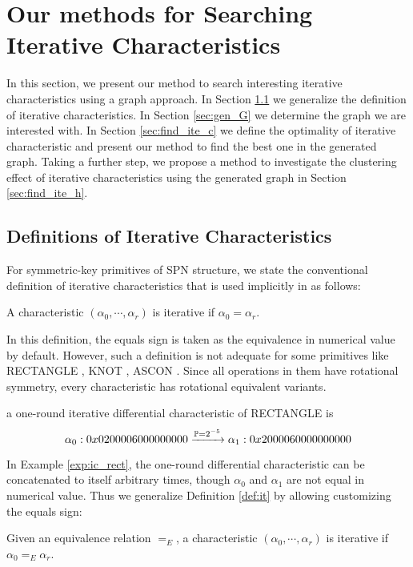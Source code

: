 \section{Our methods for Searching Iterative Characteristics}\label{sec:method_ite}

In this section, we present our method to search interesting iterative characteristics using a graph approach. In Section \ref{sec:def-it} we generalize the definition of iterative characteristics. In Section \ref{sec:gen_G} we determine the graph we are interested with. In Section \ref{sec:find_ite_c} we define the optimality of iterative characteristic and present our method to find the best one in the generated graph. Taking a further step, we propose a method to investigate the clustering effect of iterative characteristics using the generated graph in Section \ref{sec:find_ite_h}. 

\subsection{Definitions of Iterative Characteristics}\label{sec:def-it}

For symmetric-key primitives of SPN structure, we state the conventional definition of iterative characteristics that is used implicitly in \cite{wang2008differential,liu2019iterative} as follows:
\begin{definition}\label{def:it}
	A characteristic $(\alpha_0,\cdots,\alpha_r)$ is iterative if $\alpha_0=\alpha_r$.
\end{definition}

In this definition, the equals sign is taken as the equivalence in numerical value by default. However, such a definition is not adequate for some primitives like RECTANGLE \cite{zhang2015rectangle}, KNOT \cite{zhang2019knot}, ASCON \cite{dobraunig2016ascon}. Since all operations in them have rotational symmetry, every characteristic has rotational equivalent variants. 

\begin{example}\label{exp:ic_rect}
    a one-round iterative differential characteristic of RECTANGLE \cite{zhang2015rectangle} is
    \[
        \alpha_0:0x 0200 0060 0000 0000\xrightarrow{\mathbb{P}=2^{-5}}\alpha_1:0x 2000 0600 0000 0000
    \]
\end{example}

In Example \ref{exp:ic_rect}, the one-round differential characteristic can be concatenated to itself arbitrary times, though $\alpha_0$ and $\alpha_1$ are not equal in numerical value. Thus we generalize Definition \ref{def:it} by allowing customizing the equals sign:
\begin{definition}\label{def:git}
	Given an equivalence relation $=_E$, a characteristic $(\alpha_0,\cdots,\alpha_r)$ is iterative if $\alpha_0=_E\alpha_r$.
\end{definition}

